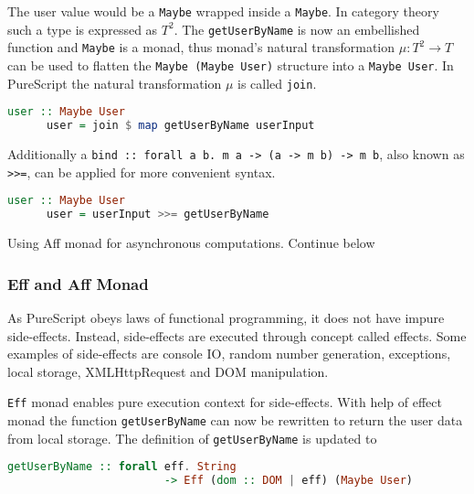 \documentclass[article]{aaltoseries}
\begin{document}
    The user value would be a \lstinline|Maybe| wrapped inside a
    \lstinline|Maybe|. In category theory such a type is expressed as $T^2$. The
    \lstinline|getUserByName| is now an embellished function and
    \lstinline|Maybe| is a monad, thus monad’s natural transformation $\mu : T^2
    \rightarrow T$ can be used to flatten the \lstinline|Maybe (Maybe User)|
    structure into a \lstinline|Maybe User|. In PureScript the natural
    transformation $\mu$ is called \lstinline|join|.
 
    \begin{lstlisting}[language=Haskell]
      user :: Maybe User
      user = join $ map getUserByName userInput
    \end{lstlisting}
 
    Additionally a \lstinline|bind :: forall a b. m a -> (a -> m b) -> m b|,
    also known as \lstinline|>>=|, can be applied for more convenient syntax.
 
    \begin{lstlisting}[language=Haskell]
      user :: Maybe User
      user = userInput >>= getUserByName
    \end{lstlisting}

    Using Aff monad for asynchronous computations. Continue below


    \subsubsection{Eff and Aff Monad}
      As PureScript obeys laws of functional programming, it does not have
      impure side-effects. Instead, side-effects are executed through concept
      called effects. Some examples of side-effects are console IO, random
      number generation, exceptions, local storage, XMLHttpRequest and DOM
      manipulation.

      \lstinline|Eff| monad enables pure execution context for side-effects.
      With help of effect monad the function \lstinline|getUserByName| can now
      be rewritten to return the user data from local storage. The definition of
      \lstinline|getUserByName| is updated to

      \begin{lstlisting}[language=Haskell]
        getUserByName :: forall eff. String 
                        -> Eff (dom :: DOM | eff) (Maybe User)
      \end{lstlisting}
 
\end{document}
